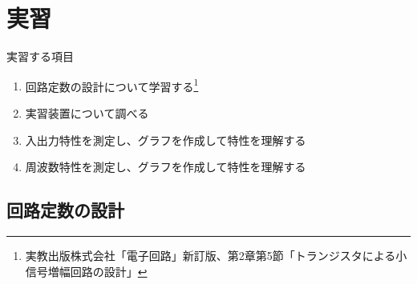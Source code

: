 \documentclass[uplatex,a4paper,11pt,oneside,openany]{jsbook}
\begin{document}
\section{実習}

実習する項目
\begin{enumerate}
	\item[(1)] 回路定数の設計について学習する\footnote{実教出版株式会社「電子回路」新訂版、第2章第5節「トランジスタによる小信号増幅回路の設計」}
	\item[(2)] 実習装置について調べる
	\item[(3)] 入出力特性を測定し、グラフを作成して特性を理解する
	\item[(4)] 周波数特性を測定し、グラフを作成して特性を理解する
\end{enumerate}

\newpage

\subsection{回路定数の設計}
\end{document}
